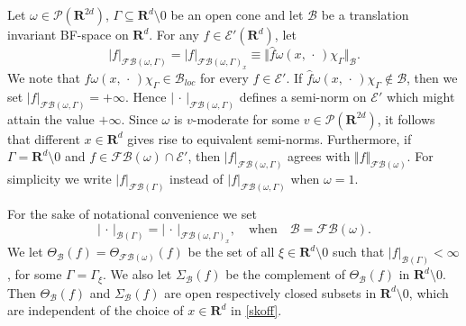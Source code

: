 \documentclass[12pt,a4paper,reqno]{amsart}
\numberwithin{equation}{section}
\numberwithin{thm}{section}
\theoremstyle{definition}
\theoremstyle{remark}
\begin{document}
Let $\omega \in \mathscr P({\mathbf R^{{2d}}})$, $\Gamma \subseteq {\mathbf R^{d}}{\setminus 0}$ be an open cone and let $\mathscr B$ be a translation
invariant BF-space on ${\mathbf R^{d}}$. For any $f\in
\mathscr E'({\mathbf R^{d}})$, let
\begin{equation}\label{skoff}
|f|_{{\mathscr F\! \mathscr B} (\omega,\Gamma)}=|f|_{{\mathscr F\! \mathscr B}(\omega,\Gamma)_x}\equiv {\Vert {\widehat{f}\omega(x,{\, \cdot \, } )\chi_{\Gamma} }\Vert _{{\mathscr{B}}}}.
\end{equation}
We note that $\widehat f\omega(x,{\, \cdot \, } )\chi_{\Gamma}\in \mathscr
B_{loc}$ for every $f\in \mathscr E'$. If $\widehat
f\omega(x,{\, \cdot \, } )\chi_{\Gamma}\notin \mathscr B$, then we set $|f|_{{\mathscr F\! \mathscr B}
(\omega,\Gamma)}=+\infty$. Hence  $|{\, \cdot \, } |_{{\mathscr F\! \mathscr B} (\omega,\Gamma)}$
defines a semi-norm on $\mathscr E'$ which might attain the value
$+\infty$. Since $\omega $ is $v$-moderate for some $v \in \mathscr
P({\mathbf R^{{2d}}})$, it follows that different $x \in {\mathbf R^{d}}$ gives rise to
equivalent semi-norms. Furthermore, if
$\Gamma ={\mathbf R^{d}}{\setminus 0}$ and $f\in \mathscr {FB}{(\omega )}\cap \mathscr E'$, then
$|f|_{{\mathscr F\! \mathscr B} (\omega,\Gamma)}$ agrees with ${\Vert f\Vert _{{{\mathscr F\! \mathscr B} {(\omega)}}}}$. For simplicity we write $|f|_{{\mathscr F\! \mathscr B} (\Gamma)}$ instead of $|f|_{{\mathscr F\! \mathscr B}
(\omega,\Gamma)}$ when $\omega =1$.

\par

For the sake of notational convenience we set
\begin{equation} \label{notconv}
|{\, \cdot \, } |_{\mathcal B(\Gamma )}=|{\, \cdot \, } |_{{\mathscr F\! \mathscr B}(\omega,\Gamma)_x}, \quad
\mbox{when}
\quad
\mathcal B={\mathscr F\! \mathscr B} (\omega).
\end{equation}
We let $ \Theta _{\mathcal B}(f)=\Theta _{{\mathscr F\! \mathscr B}(\omega)} (f)$ be the set of all $ \xi \in {\mathbf R^{d}}{\setminus 0} $ such that
$|f|_{\mathcal B(\Gamma )} < \infty$, for some $
\Gamma = \Gamma _{\xi}$.  We also let $\Sigma _{\mathcal B} (f)$
be the complement of $ \Theta_{\mathcal
B} (f)$ in ${\mathbf R^{d}}{\setminus 0} $. Then
$\Theta _{ \mathcal B} (f)$ and $\Sigma _{\mathcal
B} (f)$ are open respectively
closed subsets in ${\mathbf R^{d}}{\setminus 0}$, which are independent of
the choice of $ x \in {\mathbf R^{d}}$ in \eqref{skoff}.

\par
\end{document}
